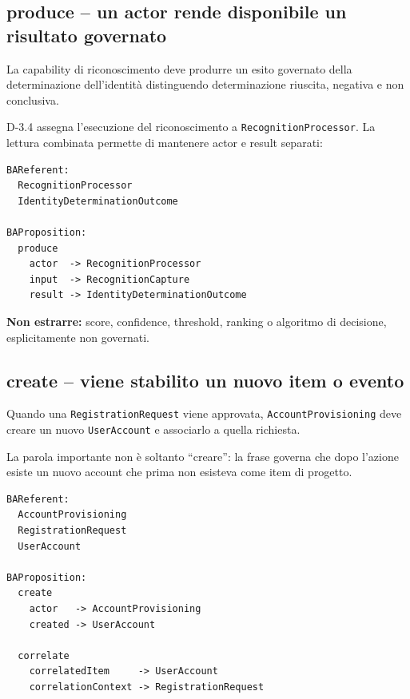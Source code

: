 \documentclass[11pt,a4paper]{article}
\newcommand{\code}[1]{\nolinkurl{#1}}
\begin{document}
\subsection{produce -- un actor rende disponibile un risultato governato}

\begin{examplebox}
La capability di riconoscimento deve produrre un esito governato della determinazione dell'identità distinguendo determinazione riuscita, negativa e non conclusiva.
\end{examplebox}

D-3.4 assegna l'esecuzione del riconoscimento a \code{RecognitionProcessor}. La lettura combinata permette di mantenere actor e result separati:

\begin{lstlisting}
BAReferent:
  RecognitionProcessor
  IdentityDeterminationOutcome

BAProposition:
  produce
    actor  -> RecognitionProcessor
    input  -> RecognitionCapture
    result -> IdentityDeterminationOutcome
\end{lstlisting}

\textbf{Non estrarre:} score, confidence, threshold, ranking o algoritmo di decisione, esplicitamente non governati.

\subsection{create -- viene stabilito un nuovo item o evento}

\begin{examplebox}
Quando una \code{RegistrationRequest} viene approvata, \code{AccountProvisioning} deve creare un nuovo \code{UserAccount} e associarlo a quella richiesta.
\end{examplebox}

La parola importante non è soltanto ``creare'': la frase governa che dopo l'azione esiste un nuovo account che prima non esisteva come item di progetto.

\begin{lstlisting}
BAReferent:
  AccountProvisioning
  RegistrationRequest
  UserAccount

BAProposition:
  create
    actor   -> AccountProvisioning
    created -> UserAccount

  correlate
    correlatedItem     -> UserAccount
    correlationContext -> RegistrationRequest
\end{lstlisting}
\end{document}
